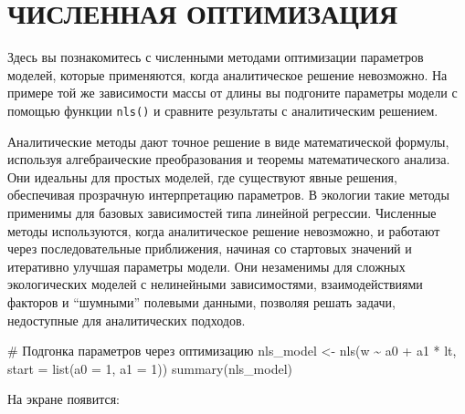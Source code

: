 \documentclass[
  letterpaper,
  DIV=11,
  numbers=noendperiod]{scrreprt}
\newenvironment{Shaded}{\begin{snugshade}}{\end{snugshade}}
\newcommand{\AttributeTok}[1]{\textcolor[rgb]{0.40,0.45,0.13}{#1}}
\newcommand{\CommentTok}[1]{\textcolor[rgb]{0.37,0.37,0.37}{#1}}
\newcommand{\DecValTok}[1]{\textcolor[rgb]{0.68,0.00,0.00}{#1}}
\newcommand{\FunctionTok}[1]{\textcolor[rgb]{0.28,0.35,0.67}{#1}}
\newcommand{\NormalTok}[1]{\textcolor[rgb]{0.00,0.23,0.31}{#1}}
\newcommand{\OtherTok}[1]{\textcolor[rgb]{0.00,0.23,0.31}{#1}}
\newcommand{\SpecialCharTok}[1]{\textcolor[rgb]{0.37,0.37,0.37}{#1}}
\begin{document}
\section{ЧИСЛЕННАЯ
ОПТИМИЗАЦИЯ}\label{ux447ux438ux441ux43bux435ux43dux43dux430ux44f-ux43eux43fux442ux438ux43cux438ux437ux430ux446ux438ux44f}

Здесь вы познакомитесь с численными методами оптимизации параметров
моделей, которые применяются, когда аналитическое решение невозможно. На
примере той же зависимости массы от длины вы подгоните параметры модели
с помощью функции \texttt{nls()} и сравните результаты с аналитическим
решением.

Аналитические методы дают точное решение в виде математической формулы,
используя алгебраические преобразования и теоремы математического
анализа. Они идеальны для простых моделей, где существуют явные решения,
обеспечивая прозрачную интерпретацию параметров. В экологии такие методы
применимы для базовых зависимостей типа линейной регрессии. Численные
методы используются, когда аналитическое решение невозможно, и работают
через последовательные приближения, начиная со стартовых значений и
итеративно улучшая параметры модели. Они незаменимы для сложных
экологических моделей с нелинейными зависимостями, взаимодействиями
факторов и ``шумными'' полевыми данными, позволяя решать задачи,
недоступные для аналитических подходов.

\begin{Shaded}
\begin{Highlighting}[]
\CommentTok{\# Подгонка параметров через оптимизацию}
\NormalTok{nls\_model }\OtherTok{\textless{}{-}} \FunctionTok{nls}\NormalTok{(w }\SpecialCharTok{\textasciitilde{}}\NormalTok{ a0 }\SpecialCharTok{+}\NormalTok{ a1 }\SpecialCharTok{*}\NormalTok{ lt, }\AttributeTok{start =} \FunctionTok{list}\NormalTok{(}\AttributeTok{a0 =} \DecValTok{1}\NormalTok{, }\AttributeTok{a1 =} \DecValTok{1}\NormalTok{))}
\FunctionTok{summary}\NormalTok{(nls\_model)}
\end{Highlighting}
\end{Shaded}

На экране появится:
\end{document}

